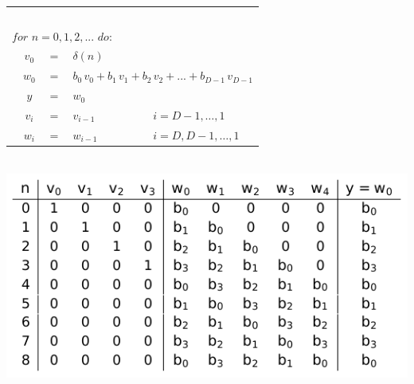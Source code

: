		\begin{minipage}{0.485\textwidth}
			\begin{tabular}{|lclll|}
			\hline &&&&$ $\\[-0.3cm]
			\multicolumn{5}{|l|}{$for\,\, n = 0,1,2,...\,\, do:$}\\
			&$v_0$&$ =$& $\delta(n)$&\\
			&$w_0$&$ = $&\multicolumn{2}{l|}{$b_0\,v_0 + b_1\,v_1 + b_2\,v_2 + ... + b_{D-1}\,v_{D-1}$}\\
			&$y$&$ =$&$ w_0$&\\
			&$v_i$&$ =$&$ v_{i-1}$ & $\qquad \quad i = D-1,\hdots,1$\\
			&$w_i$& $=$&$ w_{i-1}$ & $\qquad \quad i = D,D-1,\hdots,1$\\[0.1cm]
			\hline
			\end{tabular}\\[0.4cm]
			\includegraphics[width = \textwidth]{pic/TabelleDirektform.pdf}
		\end{minipage}

